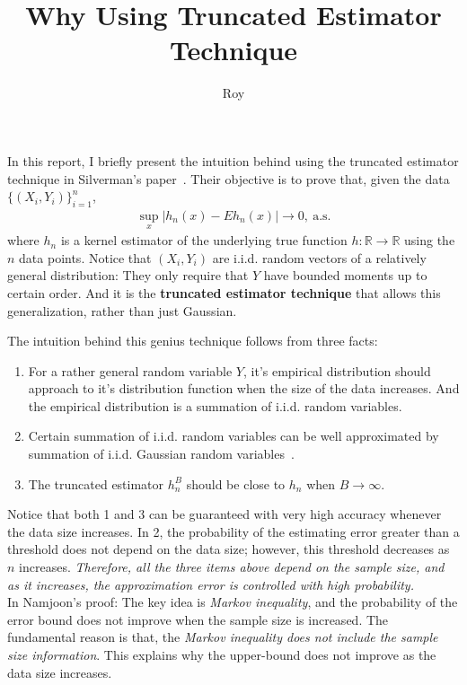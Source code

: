 \documentclass[a4paper,11pt]{article}
\begin{document}
\title{Why Using Truncated Estimator Technique}
\author{Roy}

\maketitle
In this report, I briefly present the intuition behind using the truncated estimator technique in Silverman's paper~\cite{mack1982weak}. Their objective is  to prove that, given the data $\{(X_i,Y_i)\}_{i=1}^{n}$,
\begin{align}
	\sup_{x}|h_n(x)-Eh_n(x)|\to 0,~\text{a.s.}
\end{align}
where $h_n$ is a kernel estimator of the underlying true function $h:\mathbb{R}\to\mathbb{R}$ using the $n$ data points. Notice that $(X_i,Y_i)$ are i.i.d. random vectors of a relatively general distribution: They only require that $Y$ have bounded moments up to certain order. And it is the \textbf{truncated estimator technique} that allows this generalization, rather than just Gaussian.

The intuition behind this genius technique follows from three facts:
\begin{enumerate}
\item For a rather general random variable $Y$, it's empirical distribution should approach to it's distribution function when the size of the data increases. And the empirical distribution is a summation of i.i.d. random variables. 
\item Certain summation of i.i.d. random variables can be well approximated by summation of i.i.d. Gaussian random variables~\cite{tusnady1977remark}.
\item The truncated estimator $h_n^B$ should be close to $h_n$ when $B\to\infty$.	
\end{enumerate}
Notice that both 1 and 3 can be guaranteed with very high accuracy whenever the data size increases. In 2, the probability of the estimating error greater than a threshold does not depend on the data size; however, this threshold decreases as $n$ increases. \textit{Therefore, all the three items above depend on the sample size, and as it increases, the approximation error is controlled with high probability.}\\[10pt]


In Namjoon's proof: The key idea is \textit{Markov inequality}, and the probability of the error bound does not improve when the sample size is increased. The fundamental reason is that, the \textit{Markov inequality does not include the sample size information}. This explains why the upper-bound does not improve as the data size increases.

  








\end{document}

